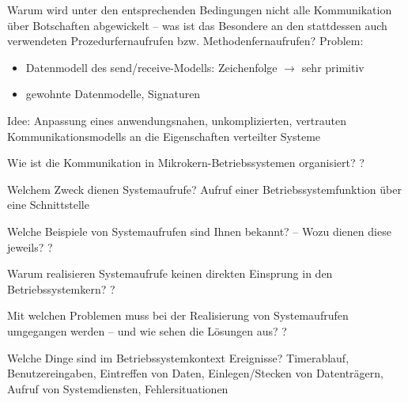 \documentclass[avery5371]{flashcards}
\begin{document}
\begin{flashcard}[Fernaufrufe]{Warum wird unter den entsprechenden Bedingungen nicht alle Kommunikation über Botschaften abgewickelt – was ist das Besondere an den stattdessen auch verwendeten Prozedurfernaufrufen bzw. Methodenfernaufrufen?}
    Problem:
    \begin{itemize}
        \item Datenmodell des send/receive-Modells: Zeichenfolge $\rightarrow$ sehr primitiv
        \item gewohnte Datenmodelle, Signaturen
    \end{itemize}
    Idee: Anpassung eines anwendungsnahen, unkomplizierten, vertrauten \\Kommunikationsmodells an die Eigenschaften verteilter Systeme
\end{flashcard}

\begin{flashcard}[Fernaufrufe]{Wie ist die Kommunikation in Mikrokern-Betriebssystemen organisiert?}
    ?
\end{flashcard}

\begin{flashcard}[Systemaufrufe]{Welchem Zweck dienen Systemaufrufe?}
    Aufruf einer Betriebssystemfunktion über eine Schnittstelle
\end{flashcard}

\begin{flashcard}[Systemaufrufe]{Welche Beispiele von Systemaufrufen sind Ihnen bekannt? – Wozu dienen diese jeweils?}
    ?
\end{flashcard}

\begin{flashcard}[Systemaufrufe]{Warum realisieren Systemaufrufe keinen direkten Einsprung in den Betriebssystemkern?}
    ?
\end{flashcard}

\begin{flashcard}[Systemaufrufe]{Mit welchen Problemen muss bei der Realisierung von Systemaufrufen umgegangen werden – und wie sehen die Lösungen aus?}
    ?
\end{flashcard}

\begin{flashcard}{Welche Dinge sind im Betriebssystemkontext Ereignisse?}
    Timerablauf, Benutzereingaben, Eintreffen von Daten, Einlegen/Stecken von Datenträgern, Aufruf von Systemdiensten, Fehlersituationen
\end{flashcard}
\end{document}
